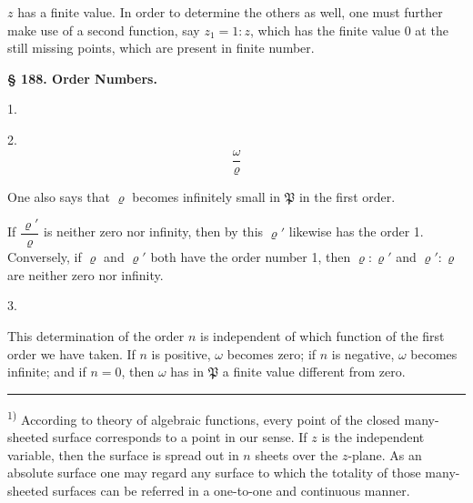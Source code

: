 $z$ has a finite value. In order to determine the others as well, one must further make use of a second function, say $z_1 = 1 : z$, which has the finite value 0 at the still missing points, which are present in finite number.


\begin{center}
\textbf{§ 188. Order Numbers.}
\end{center}

1. 

2. 
\[
\frac{\omega}{\varrho}
\]

One also says that $\varrho$ becomes infinitely small in $\mathfrak{P}$ in the first order.

If $\dfrac{\varrho'}{\varrho}$ is neither zero nor infinity, then by this $\varrho'$ likewise has the order 1. Conversely, if $\varrho$ and $\varrho'$ both have the order number 1, then $\varrho : \varrho'$ and $\varrho' : \varrho$ are neither zero nor infinity.

3. 

This determination of the order $n$ is independent of which function of the first order we have taken. If $n$ is positive, $\omega$ becomes zero; if $n$ is negative, $\omega$ becomes infinite; and if $n = 0$, then $\omega$ has in $\mathfrak{P}$ a finite value different from zero.

\medskip\noindent\rule{4cm}{0.4pt}\par
\textsuperscript{1)} According to  theory of algebraic functions, every point of the closed many-sheeted surface corresponds to a point in our sense. If $z$ is the independent variable, then the  surface is spread out in $n$ sheets over the $z$-plane.
As an absolute  surface one may regard any surface to which the totality of those many-sheeted surfaces can be referred in a one-to-one and continuous manner.
